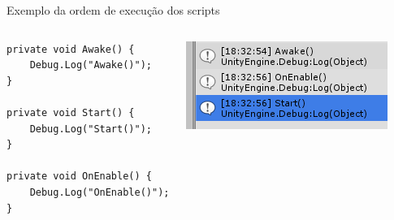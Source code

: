 \documentclass{beamer}
\begin{document}
\begin{frame}[fragile]{Exemplo da ordem de execução dos scripts}
	
\begin{columns}
\begin{lstlisting}
private void Awake() {
	Debug.Log("Awake()");
}

private void Start() {
	Debug.Log("Start()");
}

private void OnEnable() {
	Debug.Log("OnEnable()");
}
\end{lstlisting}

\includegraphics{executionorder.png}
\end{columns}
	
\end{frame}
\end{document}
